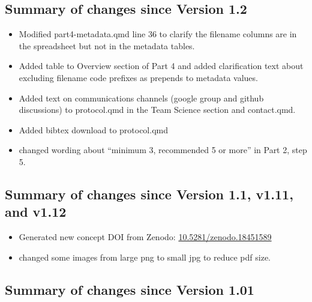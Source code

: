 \documentclass[
  letterpaper,
  DIV=11,
  numbers=noendperiod]{scrreprt}
\providecommand{\tightlist}{%
  \setlength{\itemsep}{0pt}\setlength{\parskip}{0pt}}
\begin{document}
\subsection{Summary of changes since Version
1.2}\label{summary-of-changes-since-version-1.2}

\begin{itemize}
\tightlist
\item
  Modified part4-metadata.qmd line 36 to clarify the filename columns
  are in the spreadsheet but not in the metadata tables.
\item
  Added table to Overview section of Part 4 and added clarification text
  about excluding filename code prefixes as prepends to metadata values.
\item
  Added text on communications channels (google group and github
  discussions) to protocol.qmd in the Team Science section and
  contact.qmd.
\item
  Added bibtex download to protocol.qmd
\item
  changed wording about ``minimum 3, recommended 5 or more'' in Part 2,
  step 5.
\end{itemize}

\subsection{Summary of changes since Version 1.1, v1.11, and
v1.12}\label{summary-of-changes-since-version-1.1-v1.11-and-v1.12}

\begin{itemize}
\tightlist
\item
  Generated new concept DOI from Zenodo:
  \href{https://doi.org/10.5281/zenodo.18451589}{10.5281/zenodo.18451589}
\item
  changed some images from large png to small jpg to reduce pdf size.
\end{itemize}

\subsection{Summary of changes since Version
1.01}\label{summary-of-changes-since-version-1.01}
\end{document}
